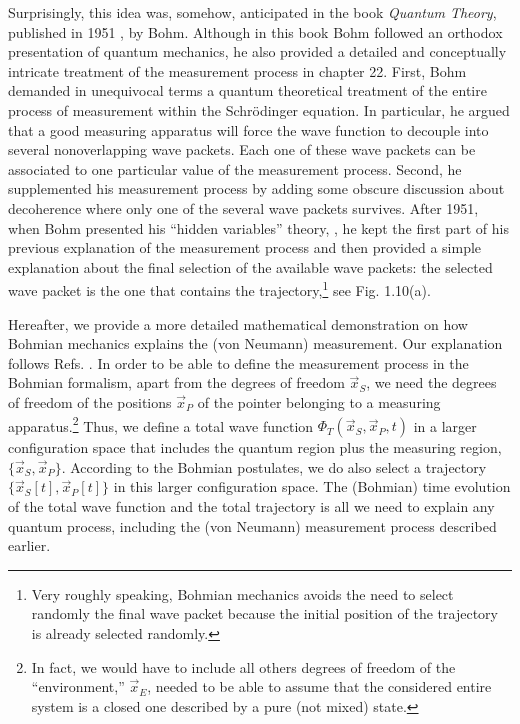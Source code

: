 \documentclass[onecolumn,nofootinbib, secnumarabic, amsmath, nobibnotes,11pt,aps,pra]{revtex4-1}
\begin{document}
Surprisingly, this idea was, somehow, anticipated in the book
\textit{Quantum Theory}, published in 1951 \cite{om.bohmbook}, by
Bohm. Although in this book Bohm followed an orthodox presentation
of quantum mechanics, he also provided a detailed and conceptually
intricate treatment of the measurement process in chapter 22. First,
Bohm demanded in unequivocal terms a quantum theoretical treatment
of the entire process of measurement within the Schr\"odinger
equation. In particular, he argued that a good measuring apparatus
will force the wave function to decouple into several nonoverlapping
wave packets. Each one of these wave packets can be associated to
one particular value of the measurement process. Second, he
supplemented his measurement process by adding some obscure
discussion about decoherence where only one of the several wave
packets survives. After 1951, when Bohm presented his ``hidden
variables'' theory, \cite{om.bohm1952a,om.bohm1952b}, he kept the
first part of his previous explanation of the measurement process
and then provided a simple explanation about the final selection of
the available wave packets: the selected wave packet is the one that
contains the trajectory,\footnote{Very roughly speaking, Bohmian
mechanics avoids the need to select randomly the final wave packet
because the initial position of the trajectory is already selected
randomly.} see Fig. 1.10(a).\enlargethispage{1pc}

Hereafter, we provide a more detailed mathematical demonstration on
how Bohmian mechanics explains the (von Neumann) measurement. Our
explanation follows Refs.
\cite{om.Holand1993,om.bomhhiley1993,om.Durrnaive,om.Durrllibre}. In
order to be able to define the measurement process in the Bohmian
formalism, apart from the degrees of freedom $\vec x_S$, we need the
degrees of freedom of the positions $\vec x_P$ of the pointer belonging to a measuring apparatus.\footnote{In fact, we would have
to include all others degrees of freedom of the ``environment,''
${\vec x_E}$, needed to be able to assume that the considered entire
system is a closed one described by a pure (not mixed)
state.} Thus, we define a total wave function
$\Phi_T(\vec x_S,\vec x_P,t)$ in a larger configuration space that
includes the quantum region plus the measuring region, $\{\vec
x_S,\vec x_P\}$. According to the Bohmian postulates, we do also
select a trajectory $\{\vec x_S[t],\vec x_P[t]\}$ in this larger
configuration space. The (Bohmian) time evolution of the total wave
function and the total trajectory is all we need to explain any
quantum process, including the (von Neumann) measurement process
described earlier.
\end{document}
